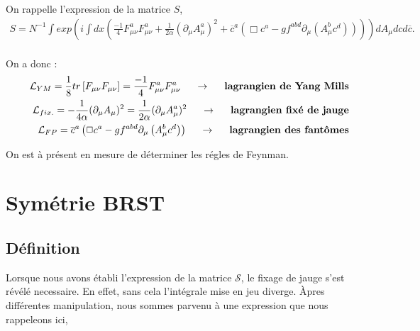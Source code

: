 \documentclass[a4paper,11pt]{article} %
\theoremstyle{plain}
\theoremstyle{definition}
\theoremstyle{remark}
\numberwithin{equation}{section}
\numberwithin{equation}{subsection}
\numberwithin{figure}{section}
\begin{document}
\noindent
On rappelle l'expression de la matrice $S$,
\begin{eqnarray*}
 S = N^{-1} \int exp \left( 
i \int dx \left( 
\frac{-1}{4} F^{a}_{\mu \nu}F^{a}_{\mu \nu} + \frac{1}{2\alpha} (\partial_{\mu} A^{a}_{\mu})^{2} 
+  \overline{c}^{a} \left( \Box c^{a} -g f^{abd} \partial_{\mu} \left( A^{b}_{\mu} c^{d} \right) \right) \right)  \right)
dA_{\mu} dc d\overline{c}.  \nonumber \\
\end{eqnarray*}

\noindent
On a donc :
\begin{eqnarray*}
 && \mathcal{L}_{YM} = \frac{1}{8} tr \left[ F_{\mu \nu}F_{\mu \nu} \right] = \frac{-1}{4} F^{a}_{\mu \nu}F^{a}_{\mu \nu}
\hspace{5mm} \rightarrow \hspace{5mm} \textbf{lagrangien de Yang Mills}\\
 && \mathcal{L}_{fix.} = - \frac{1}{4\alpha} (\partial_{\mu} A_{\mu})^{2} = \frac{1}{2\alpha} (\partial_{\mu} A^{a}_{\mu})^{2}
\hspace{5mm} \rightarrow \hspace{5mm} \textbf{lagrangien fixé de jauge}\\
 && \mathcal{L}_{FP} =  \overline{c}^{a} \left( \Box c^{a} -g f^{abd} \partial_{\mu} \left( A^{b}_{\mu} c^{d} \right) \right)
\hspace{5mm} \rightarrow \hspace{5mm} \textbf{lagrangien des fantômes}
\end{eqnarray*}

 \noindent
On est à présent en mesure de déterminer les régles de Feynman.


\section{Symétrie BRST}

  \subsection{Définition}

\noindent
Lorsque nous avons établi l'expression de la matrice $\mathcal{S}$, le fixage de jauge s'est révélé necessaire. En effet, sans cela l'intégrale mise en jeu diverge. Àpres différentes manipulation, nous sommes parvenu à une expression que nous rappeleons ici,
\end{document}
